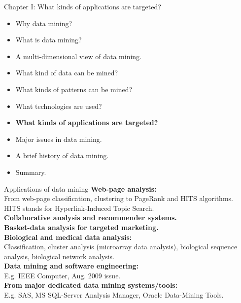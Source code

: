 \documentclass[aspectratio=169,t]{beamer}
\begin{document}
  { 
    \begin{frame}{Chapter I: What kinds of applications are targeted?}
        \begin{itemize}
            \item Why data mining?
            \item What is data mining?
            \item A multi-dimensional view of data mining.
            \item What kind of data can be mined?
            \item What kinds of patterns can be mined?
            \item What technologies are used?
            \item \textbf{What kinds of applications are targeted?}
            \item Major issues in data mining.
            \item A brief history of data mining.
            \item Summary.
        \end{itemize}
    \end{frame}
  }

  {
    \begin{frame}{Applications of data mining}
    \textbf{Web-page analysis:}\\
    From web-page classification, clustering to PageRank and HITS algorithms.\\
    HITS stands for Hyperlink-Induced Topic Search.\\[0.2cm]
    \textbf{Collaborative analysis and recommender systems.}\\
    \textbf{Basket-data analysis for targeted marketing.}\\
    \textbf{Biological and medical data analysis:}\\
    Classification, cluster analysis (microarray data analysis), biological sequence analysis, biological network analysis.\\[0.2cm]
    \textbf{Data mining and software engineering:}\\
    E.g. IEEE Computer, Aug. 2009 issue.\\
    \textbf{From major dedicated data mining systems/tools:}\\
    E.g. SAS, MS SQL-Server Analysis Manager, Oracle Data-Mining Tools.
    \end{frame}
  }
\end{document}
